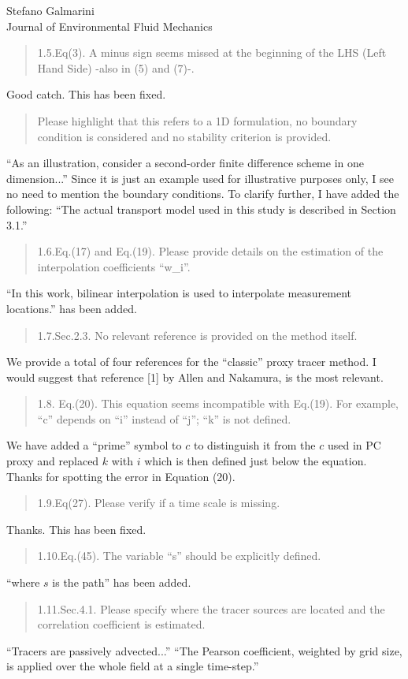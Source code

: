 \documentclass{letter}
\begin{document}
\begin{letter}{Stefano Galmarini\\
Journal of Environmental Fluid Mechanics}
\begin{quote}
1.5.Eq(3). A minus sign seems missed at the beginning of the LHS (Left Hand Side) -also in (5) and (7)-.
\end{quote}
Good catch. This has been fixed.
\begin{quote}
Please highlight that this refers to a 1D formulation, no boundary condition is considered and no stability criterion is provided.
\end{quote}
``As an illustration, consider a second-order finite difference scheme in one dimension...''
Since it is just an example used for illustrative purposes only, I see no need to mention the boundary conditions. 
To clarify further, I have added the following: ``The actual transport model used in this study is described in Section 3.1.''
\begin{quote}
1.6.Eq.(17) and Eq.(19). Please provide details on the estimation of the interpolation coefficients ``w\_i''.
\end{quote}
``In this work, bilinear interpolation is used to interpolate measurement
locations.'' has been added.
\begin{quote}
1.7.Sec.2.3. No relevant reference is provided on the method itself.
\end{quote}
We provide a total of four references for the ``classic'' proxy tracer method.
I would suggest that reference [1] by Allen and Nakamura, is the most
relevant.
\begin{quote}
1.8. Eq.(20). This equation seems incompatible with Eq.(19). For example, ``c'' depends on ``i'' instead of ``j''; ``k'' is not defined.
\end{quote}
We have added a ``prime'' symbol to $c$ to distinguish it from the $c$ used in
PC proxy and replaced $k$ with $i$ which is then defined just below the equation. Thanks for spotting the error in Equation (20).
\begin{quote}
1.9.Eq(27). Please verify if a time scale is missing.
\end{quote}
Thanks. This has been fixed.
\begin{quote}
1.10.Eq.(45). The variable ``s'' should be explicitly defined.
\end{quote}
``where $s$ is the path'' has been added.
\begin{quote}
1.11.Sec.4.1. Please specify where the tracer sources are located and the correlation coefficient is estimated.
\end{quote}
``Tracers are passively advected...''
``The Pearson coefficient, weighted by grid size, is applied over the whole field at a single time-step.''

\end{letter}
\end{document}
